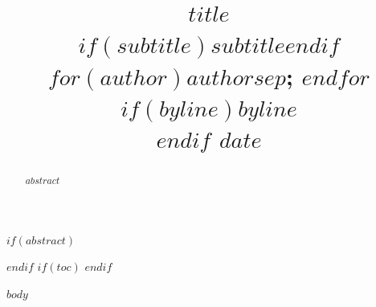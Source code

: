 \documentclass[$if(fontsize)$$fontsize$$else$11pt$endif$]{article}
\title{\vspace{-1.8cm}\bfseries $title$\\[0.6em]\large\normalfont $if(subtitle)$$subtitle$$endif$\\[1em]
\normalsize\normalfont $for(author)$$author$$sep$; $endfor$\\[0.3em]
$if(byline)$\small\normalfont $byline$\\[0.4em]$endif$
\small\normalfont $date$}
\author{}
\date{}
\begin{document}
\maketitle
$if(abstract)$
\begin{abstract}
$abstract$
\end{abstract}
$endif$
$if(toc)$
\tableofcontents
\newpage
$endif$

$body$
\end{document}
